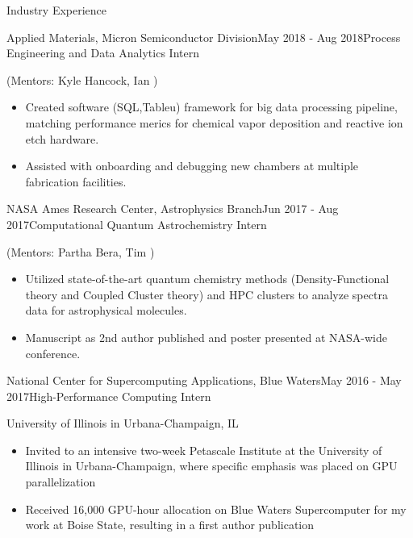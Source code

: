 \documentclass{resume} %
\begin{document}
\begin{rSection}{Industry Experience}

\begin{rSubsection}{Applied Materials, Micron Semiconductor Division}{May 2018 - Aug 2018}{Process Engineering and Data Analytics Intern}{}
\item (Mentors: Kyle Hancock, Ian )
\begin{itemize}
    \item Created software (SQL,Tableu) framework for big data processing pipeline, matching performance merics for chemical vapor deposition and reactive ion etch hardware.
    \item Assisted with onboarding and debugging new chambers at multiple fabrication facilities.
\end{itemize}
\end{rSubsection}


\begin{rSubsection}{NASA Ames Research Center, Astrophysics Branch}{Jun 2017 - Aug 2017}{Computational Quantum Astrochemistry Intern}{}
\item (Mentors: Partha Bera, Tim ) 
\begin{itemize}
    \item Utilized state-of-the-art quantum chemistry methods (Density-Functional theory and Coupled Cluster theory) and HPC clusters to analyze spectra data for astrophysical molecules.
    \item Manuscript as 2nd author published and poster presented at NASA-wide conference. 
\end{itemize}
\end{rSubsection}


\begin{rSubsection}{National Center for Supercomputing Applications, Blue Waters}{May 2016 - May 2017}{High-Performance Computing Intern}{}
\item University of Illinois in Urbana-Champaign, IL
\begin{itemize}
    \item Invited to an intensive two-week Petascale Institute at the University of Illinois in Urbana-Champaign, where specific emphasis was placed on GPU parallelization
    \item Received 16,000 GPU-hour allocation on Blue Waters Supercomputer for my work at Boise State, resulting in a first author publication
\end{itemize}
\end{rSubsection}

\end{rSection}
\end{document}
